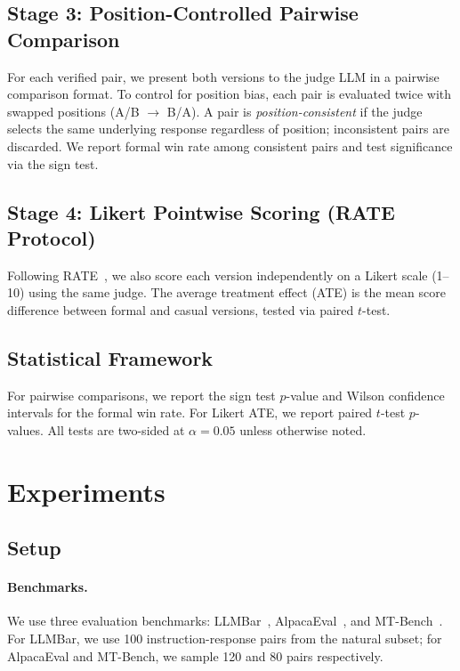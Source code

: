 \documentclass[11pt,a4paper]{article}
\begin{document}
\subsection{Stage 3: Position-Controlled Pairwise Comparison}

For each verified pair, we present both versions to the judge LLM in a pairwise comparison format.
To control for position bias, each pair is evaluated twice with swapped positions (A/B $\to$ B/A).
A pair is \emph{position-consistent} if the judge selects the same underlying response regardless of position; inconsistent pairs are discarded.
We report formal win rate among consistent pairs and test significance via the sign test.

\subsection{Stage 4: Likert Pointwise Scoring (RATE Protocol)}

Following RATE~\citep{feuer2025rate}, we also score each version independently on a Likert scale (1--10) using the same judge.
The average treatment effect (ATE) is the mean score difference between formal and casual versions, tested via paired $t$-test.

\subsection{Statistical Framework}

For pairwise comparisons, we report the sign test $p$-value and Wilson confidence intervals for the formal win rate.
For Likert ATE, we report paired $t$-test $p$-values.
All tests are two-sided at $\alpha = 0.05$ unless otherwise noted.

\section{Experiments}

\subsection{Setup}

\paragraph{Benchmarks.} We use three evaluation benchmarks: LLMBar~\citep{zeng2024llmbar}, AlpacaEval~\citep{dubois2024alpacafarm}, and MT-Bench~\citep{zheng2023judging}.
For LLMBar, we use 100 instruction-response pairs from the natural subset; for AlpacaEval and MT-Bench, we sample 120 and 80 pairs respectively.
\end{document}
